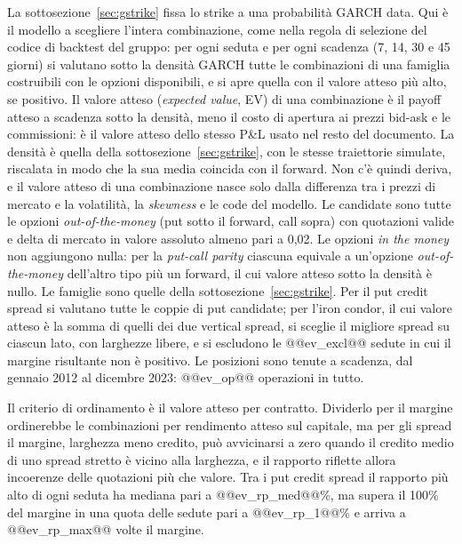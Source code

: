 \documentclass[11pt,a4paper]{article}
\begin{document}
La sottosezione~\ref{sec:gstrike} fissa lo strike a una probabilità GARCH data. Qui è il modello a scegliere l'intera combinazione, come nella regola di selezione del codice di backtest del gruppo: per ogni seduta e per ogni scadenza (7, 14, 30 e 45 giorni) si valutano sotto la densità GARCH tutte le combinazioni di una famiglia costruibili con le opzioni disponibili, e si apre quella con il valore atteso più alto, se positivo. Il valore atteso (\emph{expected value}, EV) di una combinazione è il payoff atteso a scadenza sotto la densità, meno il costo di apertura ai prezzi bid-ask e le commissioni: è il valore atteso dello stesso P\&L usato nel resto del documento. La densità è quella della sottosezione~\ref{sec:gstrike}, con le stesse traiettorie simulate, riscalata in modo che la sua media coincida con il forward. Non c'è quindi deriva, e il valore atteso di una combinazione nasce solo dalla differenza tra i prezzi di mercato e la volatilità, la \emph{skewness} e le code del modello. Le candidate sono tutte le opzioni \emph{out-of-the-money} (put sotto il forward, call sopra) con quotazioni valide e delta di mercato in valore assoluto almeno pari a 0{,}02. Le opzioni \emph{in the money} non aggiungono nulla: per la \emph{put-call parity} ciascuna equivale a un'opzione \emph{out-of-the-money} dell'altro tipo più un forward, il cui valore atteso sotto la densità è nullo. Le famiglie sono quelle della sottosezione~\ref{sec:gstrike}. Per il put credit spread si valutano tutte le coppie di put candidate; per l'iron condor, il cui valore atteso è la somma di quelli dei due vertical spread, si sceglie il migliore spread su ciascun lato, con larghezze libere, e si escludono le @@ev_excl@@ sedute in cui il margine risultante non è positivo. Le posizioni sono tenute a scadenza, dal gennaio 2012 al dicembre 2023: @@ev_op@@ operazioni in tutto.

Il criterio di ordinamento è il valore atteso per contratto. Dividerlo per il margine ordinerebbe le combinazioni per rendimento atteso sul capitale, ma per gli spread il margine, larghezza meno credito, può avvicinarsi a zero quando il credito medio di uno spread stretto è vicino alla larghezza, e il rapporto riflette allora incoerenze delle quotazioni più che valore. Tra i put credit spread il rapporto più alto di ogni seduta ha mediana pari a @@ev_rp_med@@\%, ma supera il 100\% del margine in una quota delle sedute pari a @@ev_rp_1@@\% e arriva a @@ev_rp_max@@ volte il margine.
\end{document}

